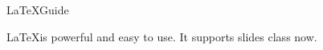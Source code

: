 \documentclass[11pt]{slides}
\begin{document}
\begin{slide}
\begin{center}
\LaTeX Guide
\end{center}
\LaTeX is powerful and easy to use. It supports slides class now.
\end{slide}
\end{document}
